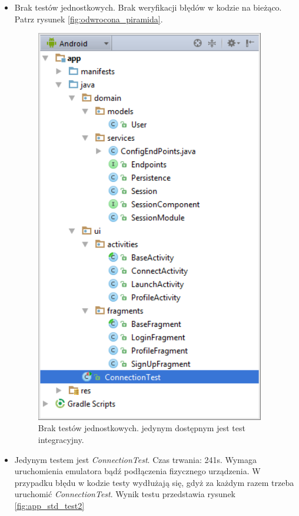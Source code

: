\begin{itemize}
\item
Brak testów jednostkowych. Brak weryfikacji błędów w kodzie na bieżąco. Patrz rysunek \ref{fig:odwrocona_piramida}.

\begin{figure}[!htb]
    \centering
    \includegraphics[width=10cm]{imgs/ch6_app_st_test1.png}
    \caption
{Brak testów jednostkowych. jedynym dostępnym jest test integracyjny.}
    \label{fig:app_std_test1}
\end{figure} 


\item
Jedynym testem jest \textit{ConnectionTest}. Czas trwania: 241s. Wymaga uruchomienia emulatora bądź podłączenia fizycznego urządzenia. W przypadku błędu w kodzie testy wydłużają się, gdyż za każdym razem trzeba uruchomić \textit{ConnectionTest}.
Wynik testu przedstawia rysunek \ref{fig:app_std_test2}


\end{itemize}
